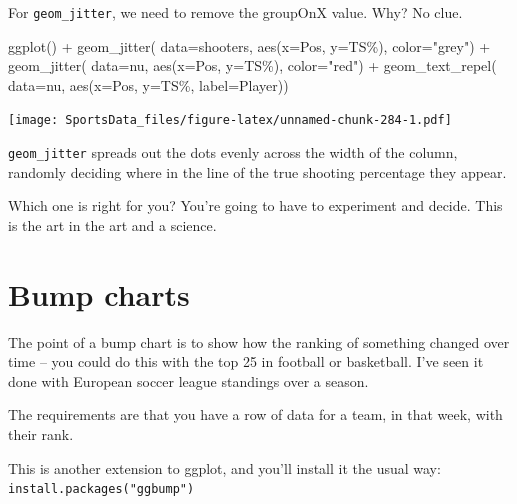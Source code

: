 \documentclass[
]{book}
\newenvironment{Shaded}{\begin{snugshade}}{\end{snugshade}}
\newcommand{\AttributeTok}[1]{\textcolor[rgb]{0.77,0.63,0.00}{#1}}
\newcommand{\FunctionTok}[1]{\textcolor[rgb]{0.00,0.00,0.00}{#1}}
\newcommand{\NormalTok}[1]{#1}
\newcommand{\SpecialCharTok}[1]{\textcolor[rgb]{0.00,0.00,0.00}{#1}}
\newcommand{\StringTok}[1]{\textcolor[rgb]{0.31,0.60,0.02}{#1}}
\begin{document}
For \texttt{geom\_jitter}, we need to remove the groupOnX value. Why? No clue.

\begin{Shaded}
\begin{Highlighting}[]
\FunctionTok{ggplot}\NormalTok{() }\SpecialCharTok{+} 
  \FunctionTok{geom\_jitter}\NormalTok{(}
    \AttributeTok{data=}\NormalTok{shooters, }
    \FunctionTok{aes}\NormalTok{(}\AttributeTok{x=}\NormalTok{Pos, }\AttributeTok{y=}\StringTok{\textasciigrave{}}\AttributeTok{TS\%}\StringTok{\textasciigrave{}}\NormalTok{), }\AttributeTok{color=}\StringTok{"grey"}\NormalTok{) }\SpecialCharTok{+} 
  \FunctionTok{geom\_jitter}\NormalTok{(}
    \AttributeTok{data=}\NormalTok{nu, }
    \FunctionTok{aes}\NormalTok{(}\AttributeTok{x=}\NormalTok{Pos, }\AttributeTok{y=}\StringTok{\textasciigrave{}}\AttributeTok{TS\%}\StringTok{\textasciigrave{}}\NormalTok{), }\AttributeTok{color=}\StringTok{"red"}\NormalTok{) }\SpecialCharTok{+} 
  \FunctionTok{geom\_text\_repel}\NormalTok{(}
    \AttributeTok{data=}\NormalTok{nu, }
    \FunctionTok{aes}\NormalTok{(}\AttributeTok{x=}\NormalTok{Pos, }\AttributeTok{y=}\StringTok{\textasciigrave{}}\AttributeTok{TS\%}\StringTok{\textasciigrave{}}\NormalTok{, }\AttributeTok{label=}\NormalTok{Player))}
\end{Highlighting}
\end{Shaded}

\texttt{[image: SportsData\_files/figure-latex/unnamed-chunk-284-1.pdf]}

\texttt{geom\_jitter} spreads out the dots evenly across the width of the column, randomly deciding where in the line of the true shooting percentage they appear.

Which one is right for you? You're going to have to experiment and decide. This is the art in the art and a science.

\hypertarget{bump-charts}{%
\chapter{Bump charts}\label{bump-charts}}

The point of a bump chart is to show how the ranking of something changed over time -- you could do this with the top 25 in football or basketball. I've seen it done with European soccer league standings over a season.

The requirements are that you have a row of data for a team, in that week, with their rank.

This is another extension to ggplot, and you'll install it the usual way: \texttt{install.packages("ggbump")}
\end{document}

